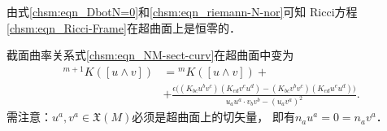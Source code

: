 由式\eqref{chsm:eqn_DbotN=0}和\eqref{chsm:eqn_riemann-N-nor}可知
Ricci方程\eqref{chsm:eqn_Ricci-Frame}在超曲面上是恒零的．

截面曲率关系式\eqref{chsm:eqn_NM-sect-curv}在超曲面中变为
\begin{equation}   \label{chsm:eqn_SigmaM-sect-curv}
    \begin{aligned}
    {}^{m+1} K([u\wedge v]) &= {}^{m} K([u\wedge v]) + \\ 
    &+ \frac{\epsilon \bigl( 
        (K_{bc} u^b v^c) (K_{ed} v^e u^d)
        -(K_{bc} v^b v^c) (K_{ed} u^e u^d) 
        \bigr)}
    {{u}_a{u}^a \cdot {v}_b{v}^b - ({u}_a{v}^a)^2 }  .
    \end{aligned}
\end{equation} %
需注意：$u^a,v^a\in \mathfrak{X}(M)$必须是超曲面上的切矢量，
即有$n_a u^a =0 = n_av^a$．



